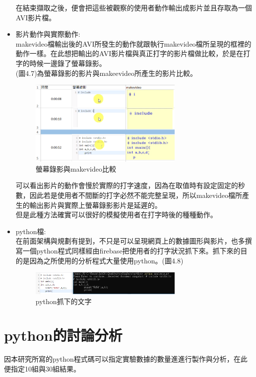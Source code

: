 \begin{itemize}
	在結束擷取之後，便會把這些被觀察的使用者動作輸出成影片並且存取為一個AVI影片檔。
	
	\item 影片動作與實際動作:\\
	makevideo檔輸出後的AVI所發生的動作就跟執行makevideo檔所呈現的框裡的動作一樣。在此想把輸出的AVI影片檔與真正打字的影片檔做比較，於是在打字的時候一邊錄了螢幕錄影。\\
	(圖4.7)為螢幕錄影的影片與makeevideo所產生的影片比較。
		\begin{figure}[H] 
		\centering 
		\includegraphics[width=0.7\textwidth]{diff.png}
		\caption{螢幕錄影與makevideo比較} 
		\label{Fig.4.4.3} 
		\end{figure}
	可以看出影片的動作會慢於實際的打字速度，因為在取值時有設定固定的秒數，因此若是使用者不間斷的打字必然不能完整呈現，所以makevideo檔所產生的輸出影片與實際上螢幕錄影影片是延遲的。\\
	但是此種方法確實可以很好的模擬使用者在打字時後的種種動作。
	\item python檔:\\
	在前面架構與規劃有提到，不只是可以呈現網頁上的數據圖形與影片，也多撰寫一個python程式同樣經由firebase把使用者的打字狀況抓下來。抓下來的目的是因為之所使用的分析程式大量使用python。(圖4.8)
	\begin{figure}[H] 
		\centering 
		\includegraphics[width=0.7\textwidth]{anysis.png}
		\caption{python抓下的文字} 
		\label{Fig.4.4.4} 
	\end{figure}
\end{itemize}

\section{python的討論分析}
因本研究所寫的python程式碼可以指定實驗數據的數量進進行製作與分析，在此便指定10組與30組結果。
